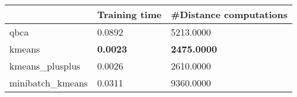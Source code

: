 \begin{table}[htbp]
\centering
\begin{tabular}{lll}
\toprule
 & Training time & #Distance computations \\
\midrule
qbca & 0.0892 & 5213.0000 \\
kmeans & \textbf{0.0023} & \textbf{2475.0000} \\
kmeans_plusplus & 0.0026 & 2610.0000 \\
minibatch_kmeans & 0.0311 & 9360.0000 \\
\bottomrule
\end{tabular}
\end{table}
